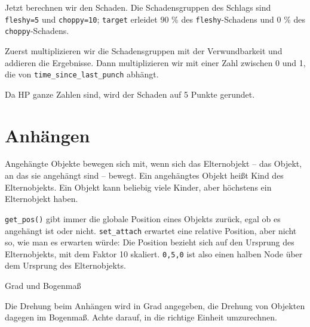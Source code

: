 Jetzt berechnen wir den Schaden. Die Schadensgruppen des Schlags sind
\texttt{fleshy=5} und \texttt{choppy=10}; \texttt{target} erleidet 90 \%
des \texttt{fleshy}-Schadens und 0 \% des \texttt{choppy}-Schadens.

Zuerst multiplizieren wir die Schadensgruppen mit der Verwundbarkeit und
addieren die Ergebnisse. Dann multiplizieren wir mit einer Zahl zwischen
0 und 1, die von
\texttt{time\_\allowbreak{}since\_\allowbreak{}last\_\allowbreak{}punch}
abhängt.

\begin{Shaded}
\begin{Highlighting}[]

\end{Highlighting}
\end{Shaded}

Da HP ganze Zahlen sind, wird der Schaden auf 5 Punkte gerundet.

\section{Anhängen}\label{anhuxe4ngen}

Angehängte Objekte bewegen sich mit, wenn sich das Elternobjekt -- das
Objekt, an das sie angehängt sind -- bewegt. Ein angehängtes Objekt
heißt Kind des Elternobjekts. Ein Objekt kann beliebig viele Kinder,
aber höchstens ein Elternobjekt haben.

\begin{Shaded}
\begin{Highlighting}[]
\OperatorTok{:}\OperatorTok{(}\OperatorTok{,} \OperatorTok{,} \OperatorTok{,} \OperatorTok{)}
\end{Highlighting}
\end{Shaded}

\texttt{get\_\allowbreak{}pos()} gibt immer die globale Position eines
Objekts zurück, egal ob es angehängt ist oder nicht.
\texttt{set\_\allowbreak{}attach} erwartet eine relative Position, aber
nicht so, wie man es erwarten würde: Die Position bezieht sich auf den
Ursprung des Elternobjekts, mit dem Faktor 10 skaliert. \texttt{0,5,0}
ist also einen halben Node über dem Ursprung des Elternobjekts.

\begin{hinweis}{Grad und Bogenmaß}

Die Drehung beim Anhängen wird in Grad angegeben, die Drehung von
Objekten dagegen im Bogenmaß. Achte darauf, in die richtige Einheit
umzurechnen.

\end{hinweis}

